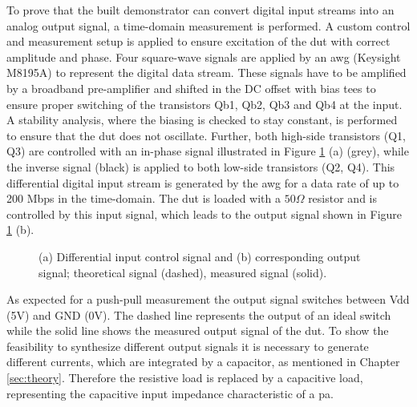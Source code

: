 \documentclass[journal]{IEEEtran}
\begin{document}
To prove that the built demonstrator can convert digital input streams into an analog output signal, a time-domain measurement is performed.
A custom control and measurement setup is applied to ensure excitation of the \gls{dut} with correct amplitude and phase.
Four square-wave signals are applied by an \gls{awg} (Keysight M8195A) to represent the digital data stream. 
These signals have to be amplified by a broadband pre-amplifier and shifted in the DC offset with bias tees to ensure proper switching of the transistors Qb1, Qb2, Qb3 and Qb4 at the input. A stability analysis, where the biasing is checked to stay constant, is performed to ensure that the \gls{dut} does not oscillate.
Further, both high-side transistors (Q1, Q3) are controlled with an in-phase signal illustrated in Figure \ref{fig:meas_Input_Output_RLoad_100M_SmallSize_Paper} (a) (grey), while the inverse signal (black) is applied to both low-side transistors (Q2, Q4).
This differential digital input stream is generated by the \gls{awg} for a data rate of up to 200 Mbps in the time-domain.
The \gls{dut} is loaded with a $50 \Omega$ resistor and is controlled by this input signal, which leads to the output signal shown in Figure \ref{fig:meas_Input_Output_RLoad_100M_SmallSize_Paper} (b).
%
\begin{figure}[htb]
  \centering
	\begin{scriptsize}
  	\def\svgwidth{\columnwidth}
 	 
  	\caption{(a) Differential input control signal and (b) corresponding output signal; theoretical signal (dashed), measured signal (solid).}
  	\label{fig:meas_Input_Output_RLoad_100M_SmallSize_Paper}
	\end{scriptsize}
\end{figure}
%
As expected for a push-pull measurement the output signal switches between Vdd (5V) and GND (0V).
The dashed line represents the output of an ideal switch while the solid line shows the measured output signal of the \gls{dut}.
To show the feasibility to synthesize different output signals it is necessary to generate different currents, which are integrated by a capacitor, as mentioned in Chapter \ref{sec:theory}.
Therefore the resistive load is replaced by a capacitive load, representing the capacitive input impedance characteristic of a \gls{pa}.
\end{document}

